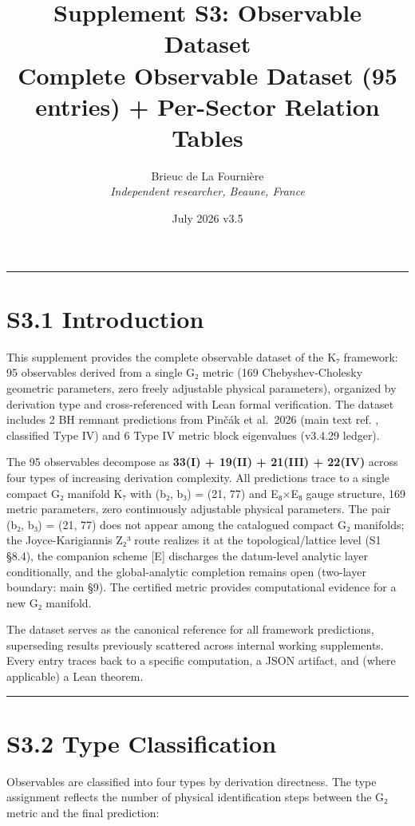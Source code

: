 \documentclass[11pt,a4paper]{article}
\title{%
\LARGE\textbf{Supplement S3: Observable Dataset}\\[0.3em]
\large Complete Observable Dataset (95 entries) + Per-Sector Relation Tables%
}
\author{Brieuc de La Fourni\`ere \\ \textit{Independent researcher, Beaune, France}}
\date{July 2026 \quad\textbar\quad v3.5}
\begin{document}
\maketitle
\noindent\rule{\textwidth}{0.2pt}

\thispagestyle{fancy}

\section{S3.1 Introduction}\label{s3.1-introduction}

This supplement provides the complete observable dataset of the K₇ framework: 95 observables derived from a single G₂ metric (169 Chebyshev-Cholesky geometric parameters, zero freely adjustable physical parameters), organized by derivation type and cross-referenced with Lean formal verification. The dataset includes 2 BH remnant predictions from Pinčák et al.~2026 (main text ref. \cite{42}, classified Type IV) and 6 Type IV metric block eigenvalues (v3.4.29 ledger).

The 95 observables decompose as \textbf{33(I) + 19(II) + 21(III) + 22(IV)} across four types of increasing derivation complexity. All predictions trace to a single compact G₂ manifold K₇ with (b₂, b₃) = (21, 77) and E₈×E₈ gauge structure, 169 metric parameters, zero continuously adjustable physical parameters. The pair (b₂, b₃) = (21, 77) does not appear among the catalogued compact G₂ manifolds; the Joyce-Karigiannis Z₂³ route realizes it at the topological/lattice level (S1 §8.4), the companion scheme {[}E{]} discharges the datum-level analytic layer conditionally, and the global-analytic completion remains open (two-layer boundary: main §9). The certified metric provides computational evidence for a new G₂ manifold.

The dataset serves as the canonical reference for all framework predictions, superseding results previously scattered across internal working supplements. Every entry traces back to a specific computation, a JSON artifact, and (where applicable) a Lean theorem.

\begin{center}\rule{\linewidth}{0.5pt}\end{center}

\section{S3.2 Type Classification}\label{s3.2-type-classification}

Observables are classified into four types by derivation directness. The type assignment reflects the number of physical identification steps between the G₂ metric and the final prediction:
\end{document}

